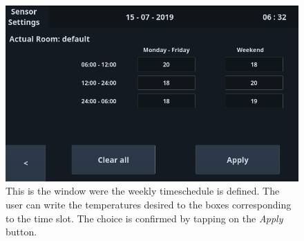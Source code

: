\documentclass[a4paper]{article}
\begin{document}
        \begin{figure}[htp]
            \centering
            \includegraphics[width=0.8 \columnwidth]{./prog.png}
            \caption{
                    \label{fig:prog}
                    This is the window were the weekly timeschedule is defined. The user can write the temperatures desired to the boxes corresponding to the time slot. The choice is confirmed by tapping on the \emph{Apply} button.
            }
        \end{figure}

 
    
\end{document}
